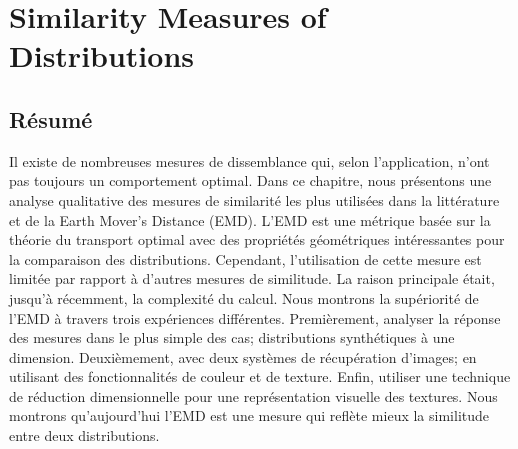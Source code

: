 
\chapter{Similarity Measures of Distributions}\label{ch:similarity_measures}


\section*{Résumé}
\noindent Il existe de nombreuses mesures de dissemblance qui, selon l'application, n'ont pas toujours un comportement optimal. Dans ce chapitre, nous présentons une analyse qualitative des mesures de similarité les plus utilisées dans la littérature et de la Earth Mover's Distance (EMD). L'EMD est une métrique basée sur la théorie du transport optimal avec des propriétés géométriques intéressantes pour la comparaison des distributions. Cependant, l'utilisation de cette mesure est limitée par rapport à d'autres mesures de similitude. La raison principale était, jusqu'à récemment, la complexité du calcul. Nous montrons la supériorité de l'EMD à travers trois expériences différentes. Premièrement, analyser la réponse des mesures dans le plus simple des cas; distributions synthétiques à une dimension. Deuxièmement, avec deux systèmes de récupération d'images; en utilisant des fonctionnalités de couleur et de texture. Enfin, utiliser une technique de réduction dimensionnelle pour une représentation visuelle des textures. Nous montrons qu'aujourd'hui l'EMD est une mesure qui reflète mieux la similitude entre deux distributions.

